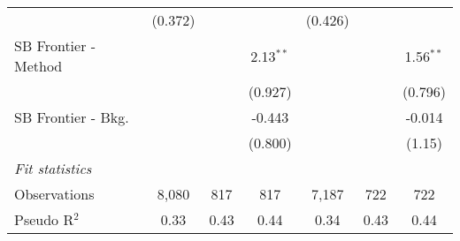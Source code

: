 \begin{tabular}{lcccccc}
                                  & (0.372)       &               &               & (0.426)       &               &   \\   
   SB Frontier - Method           &               &               & 2.13$^{**}$   &               &               & 1.56$^{**}$\\   
                                  &               &               & (0.927)       &               &               & (0.796)\\   
   SB Frontier - Bkg.             &               &               & -0.443        &               &               & -0.014\\   
                                  &               &               & (0.800)       &               &               & (1.15)\\   
   \midrule
   \emph{Fit statistics}\\
   Observations                   & 8,080         & 817           & 817           & 7,187         & 722           & 722\\  
   Pseudo R$^2$                   & 0.33          & 0.43          & 0.44          & 0.34          & 0.43          & 0.44\\  
   

\end{tabular}
